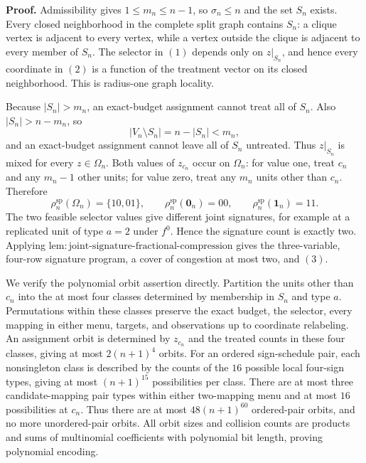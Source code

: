 \textbf{Proof.}
Admissibility gives \(1\le m_n\le n-1\), so \(\sigma_n\le n\) and the set \(S_n\) exists. Every closed neighborhood in the complete split graph contains \(S_n\): a clique vertex is adjacent to every vertex, while a vertex outside the clique is adjacent to every member of \(S_n\). The selector in \((1)\) depends only on \(z|_{S_n}\), and hence every coordinate in \((2)\) is a function of the treatment vector on its closed neighborhood. This is radius-one graph locality.

Because \(|S_n|>m_n\), an exact-budget assignment cannot treat all of \(S_n\). Also \(|S_n|>n-m_n\), so
\[
 |V_n\setminus S_n|=n-|S_n|<m_n,
\]
and an exact-budget assignment cannot leave all of \(S_n\) untreated. Thus \(z|_{S_n}\) is mixed for every \(z\in\Omega_n\). Both values of \(z_{c_n}\) occur on \(\Omega_n\): for value one, treat \(c_n\) and any \(m_n-1\) other units; for value zero, treat any \(m_n\) units other than \(c_n\). Therefore
\[
 \rho_n^{\mathrm{sp}}(\Omega_n)=\{10,01\},
 \qquad
 \rho_n^{\mathrm{sp}}(\mathbf 0_n)=00,
 \qquad
 \rho_n^{\mathrm{sp}}(\mathbf 1_n)=11. \tag{5}
\]
The two feasible selector values give different joint signatures, for example at a replicated unit of type \(a=2\) under \(f^0\). Hence the signature count is exactly two. Applying \(\mathrm{lem{:}joint\text{-}signature\text{-}fractional\text{-}compression}\) gives the three-variable, four-row signature program, a cover of congestion at most two, and \((3)\).

We verify the polynomial orbit assertion directly. Partition the units other than \(c_n\) into the at most four classes determined by membership in \(S_n\) and type \(a\). Permutations within these classes preserve the exact budget, the selector, every mapping in either menu, targets, and observations up to coordinate relabeling. An assignment orbit is determined by \(z_{c_n}\) and the treated counts in these four classes, giving at most \(2(n+1)^4\) orbits. For an ordered sign-schedule pair, each nonsingleton class is described by the counts of the \(16\) possible local four-sign types, giving at most \((n+1)^{15}\) possibilities per class. There are at most three candidate-mapping pair types within either two-mapping menu and at most \(16\) possibilities at \(c_n\). Thus there are at most \(48(n+1)^{60}\) ordered-pair orbits, and no more unordered-pair orbits. All orbit sizes and collision counts are products and sums of multinomial coefficients with polynomial bit length, proving polynomial encoding.

